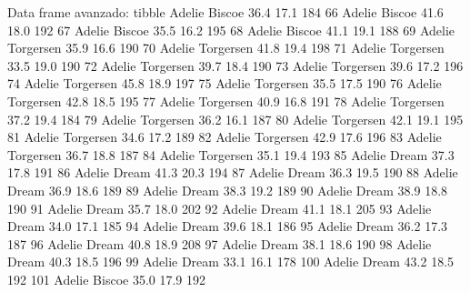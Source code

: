 \documentclass[
  ignorenonframetext,
  aspectratio=169]{beamer}
\let\oldverbatim\verbatim
\let\endoldverbatim\endverbatim
\renewenvironment{verbatim}{\tiny\oldverbatim}{\endoldverbatim}
\begin{document}
\begin{frame}[fragile]{Data frame avanzado: tibble}
\begin{verbatim}
65     Adelie    Biscoe           36.4          17.1               184
66     Adelie    Biscoe           41.6          18.0               192
67     Adelie    Biscoe           35.5          16.2               195
68     Adelie    Biscoe           41.1          19.1               188
69     Adelie Torgersen           35.9          16.6               190
70     Adelie Torgersen           41.8          19.4               198
71     Adelie Torgersen           33.5          19.0               190
72     Adelie Torgersen           39.7          18.4               190
73     Adelie Torgersen           39.6          17.2               196
74     Adelie Torgersen           45.8          18.9               197
75     Adelie Torgersen           35.5          17.5               190
76     Adelie Torgersen           42.8          18.5               195
77     Adelie Torgersen           40.9          16.8               191
78     Adelie Torgersen           37.2          19.4               184
79     Adelie Torgersen           36.2          16.1               187
80     Adelie Torgersen           42.1          19.1               195
81     Adelie Torgersen           34.6          17.2               189
82     Adelie Torgersen           42.9          17.6               196
83     Adelie Torgersen           36.7          18.8               187
84     Adelie Torgersen           35.1          19.4               193
85     Adelie     Dream           37.3          17.8               191
86     Adelie     Dream           41.3          20.3               194
87     Adelie     Dream           36.3          19.5               190
88     Adelie     Dream           36.9          18.6               189
89     Adelie     Dream           38.3          19.2               189
90     Adelie     Dream           38.9          18.8               190
91     Adelie     Dream           35.7          18.0               202
92     Adelie     Dream           41.1          18.1               205
93     Adelie     Dream           34.0          17.1               185
94     Adelie     Dream           39.6          18.1               186
95     Adelie     Dream           36.2          17.3               187
96     Adelie     Dream           40.8          18.9               208
97     Adelie     Dream           38.1          18.6               190
98     Adelie     Dream           40.3          18.5               196
99     Adelie     Dream           33.1          16.1               178
100    Adelie     Dream           43.2          18.5               192
101    Adelie    Biscoe           35.0          17.9               192

\end{verbatim}
\end{frame}
\end{document}
